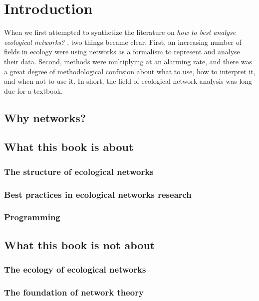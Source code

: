 \chapter{Introduction\label{chap:introduction}}

When we first attempted to synthetize the literature on \emph{how to best
analyse ecological networks?} \parencite{DelBesBri18}, two things became clear.
First, an increasing number of fields in ecology were using networks as a
formalism to represent and analyse their data. Second, methods were multiplying
at an alarming rate, and there was a great degree of methodological confusion
about what to use, how to interpret it, and when not to use it. In short, the
field of ecological network analysis was long due for a textbook.

\section{Why networks?}

\section{What this book is about}

\subsection{The structure of ecological networks}

\subsection{Best practices in ecological networks research}

\subsection{Programming}

\section{What this book is not about}

\subsection{The ecology of ecological networks}

\subsection{The foundation of network theory}

